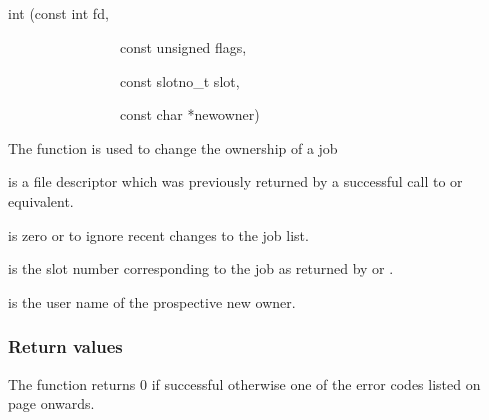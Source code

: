 \subsection{\funcnameXBjobchown{}}

\begin{expara}

int \funcnameXBjobchown{}(const int fd,

\ \ \ \ \ \ \ \ \ \ \ \ \ \ \ \ const unsigned flags,

\ \ \ \ \ \ \ \ \ \ \ \ \ \ \ \ const slotno\_t slot,

\ \ \ \ \ \ \ \ \ \ \ \ \ \ \ \ const char *newowner)

\end{expara}

The function \funcXBjobchown{} is used to change the
ownership of a job

 is a file descriptor which was previously
returned by a successful call to \funcXBopen{} or equivalent.

 is zero or
 to ignore recent changes to
the job list.

 is the slot number corresponding to the job
as returned by \funcXBjoblist{} or
\funcXBjobfindslot{}.

 is the user name of the prospective new
owner.

\subsubsection{Return values}
The function returns 0 if successful otherwise one of the error codes
listed on page \pageref{errorcodes} onwards.


